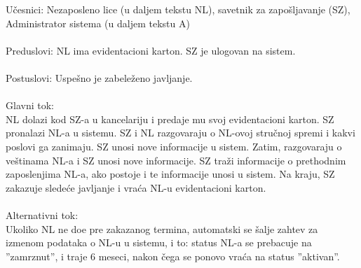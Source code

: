 \noindent U\v cesnici: Nezaposleno lice (u daljem tekstu NL), savetnik za zapo\v sljavanje (SZ), Administrator sistema (u daljem tekstu A)
\\
\\ Preduslovi: NL ima evidentacioni karton. SZ je ulogovan na sistem. 
\\
\\ Postuslovi: Uspe\v sno je zabele\v zeno javljanje.
\\ 
\\ Glavni tok:
\\ NL dolazi kod SZ-a u kancelariju i predaje mu svoj evidentacioni karton. SZ pronalazi NL-a u sistemu. SZ i NL razgovaraju o NL-ovoj stru\v cnoj spremi i kakvi poslovi ga zanimaju. SZ unosi nove informacije u sistem. Zatim, razgovaraju o ve\v stinama NL-a i SZ unosi nove informacije. SZ tra\v zi informacije o prethodnim zaposlenjima NL-a, ako postoje i te informacije unosi u sistem. Na kraju, SZ zakazuje slede\' ce javljanje i vra\' ca NL-u evidentacioni karton.
\\
\\ Alternativni tok:
\\ Ukoliko NL ne do\dj e pre zakazanog termina, automatski se \v salje zahtev za izmenom podataka o NL-u u sistemu, i to: status NL-a se prebacuje na ''zamrznut'', i traje 6 meseci, nakon \v cega se ponovo vra\' ca na status ''aktivan''.
